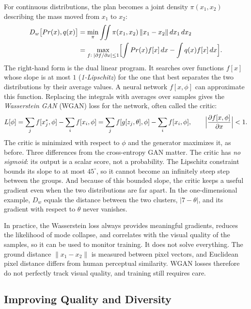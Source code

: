 For continuous distributions, the plan becomes a joint density
$\pi(x_1,x_2)$ describing the mass moved from $x_1$ to $x_2$:
\begin{align}
  D_w\bigl[Pr(x),q(x)\bigr]
  &= \min_{\pi}\iint \pi(x_1,x_2)\,\|x_1-x_2\|\,dx_1\,dx_2 \notag\\
  &= \max_{f:\;|\partial f/\partial x|\le1}
    \Bigl[\int Pr(x)f[x]\,dx - \int q(x)f[x]\,dx\Bigr].
  \label{eq:wasserstein-dual}
\end{align}
\noindent
The right-hand form is the dual linear program. It searches over functions
$f[x]$ whose slope is at most $1$ (\emph{1-Lipschitz}) for the one that best
separates the two distributions by their average values. A neural network
$f[x,\phi]$ can approximate this function. Replacing the integrals with
averages over samples gives the \emph{Wasserstein GAN} (WGAN) loss for the
network, often called the critic:
\begin{equation}
  L[\phi] = \sum_j f[x_j^*,\phi] - \sum_i f[x_i,\phi]
          = \sum_j f[g[z_j,\theta],\phi] - \sum_i f[x_i,\phi],
  \qquad \Bigl|\frac{\partial f[x,\phi]}{\partial x}\Bigr| < 1 .
  \label{eq:wgan}
\end{equation}
\noindent
The critic is minimized with respect to $\phi$ and the generator maximizes it,
as before. Three differences from the cross-entropy GAN matter. The critic has
\emph{no sigmoid}: its output is a scalar score, not a probability. The
Lipschitz constraint bounds its slope to at most $45^\circ$, so it cannot
become an infinitely steep step between the groups. And because of this bounded
slope, the critic keeps a useful gradient even when the two distributions are
far apart. In the one-dimensional example, $D_w$ equals the distance between
the two clusters, $|7-\theta|$, and its gradient with respect to $\theta$ never
vanishes.

In practice, the Wasserstein loss always provides meaningful gradients, reduces
the likelihood of mode collapse, and correlates with the visual quality of the
samples, so it can be used to monitor training. It does not solve everything.
The ground distance $\|x_1-x_2\|$ is measured between pixel vectors, and
Euclidean pixel distance differs from human perceptual similarity. WGAN losses
therefore do not perfectly track visual quality, and training still requires
care.

\subsection{Improving Quality and Diversity}

